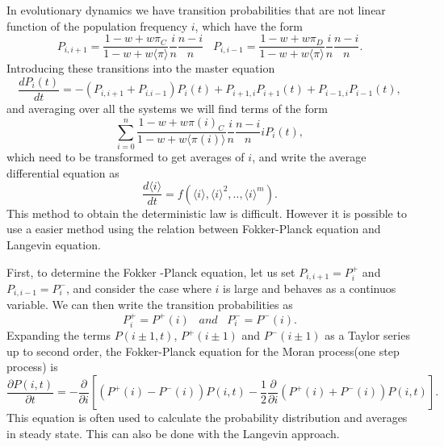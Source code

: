 In evolutionary dynamics we have transition probabilities that are not linear function of the population frequency $i$, which have the form
\begin{equation}
P_{i,i+1}=\frac{1-w+w\pi_C}{1-w+w\langle \pi \rangle}\frac{i}{n}\frac{n-i}{n}\;\;\; P_{i,i-1}=\frac{1-w+w\pi_D}{1-w+w\langle \pi \rangle}\frac{i}{n}\frac{n-i}{n}.
\end{equation}
Introducing these transitions into the  master equation  
\begin{equation}
\frac{d P_{i}(t)}{dt}=-(P_{i,i+1} + P_{i.i-1})P_{i}(t) + P_{i+1,i}P_{i+1}(t)+ P_{i-1,i}P_{i-1}(t),
\end{equation}
and averaging over all the systems we will find terms of the form
\begin{equation}
\sum\limits_{i=0}^{n}\frac{1-w+w\pi(i)_C}{1-w+w\langle \pi(i) \rangle}\frac{i}{n}\frac{n-i}{n} i P_{i}(t),
\end{equation}
which need to be transformed to get averages of $i$, and write the average differential equation as
\begin{equation}
\frac{d\langle i \rangle}{dt}=f(\langle i \rangle,\langle i \rangle^2, .., \langle i \rangle^m).
\end{equation}  
This method to obtain the deterministic law is difficult. However it is possible to use a easier method using the relation between Fokker-Planck equation and Langevin equation.

 
First, to determine the Fokker -Planck equation, let us set $P_{i,i+1}=P_{i}^{+}$ and $P_{i,i-1}=P_{i}^{-}$, and consider the case where $i$ is large and behaves as a continuos variable. We can then write the transition probabilities as
\begin{equation}
P_{i}^{+}=P^{+}(i)\;\;\; and \;\;\; P_{i}^{-}=P^{-}(i).
\end{equation}  
Expanding the terms $P(i\pm 1,t)$, $P^{+}(i\pm1)$ and $P^{-}(i\pm1)$ as a Taylor series up to second order, the Fokker-Planck equation for the Moran process(one step process) is\cite{Traulsen2005a}
\begin{equation}\label{6.19}
\frac{\partial P(i,t)}{\partial t}=-\frac{\partial}{\partial i}\left[\left(P^{+}(i)-P^{-}(i)\right)P(i,t)-\frac{1}{2}\frac{\partial}{\partial i}\left(P^{+}(i)+P^{-}(i)\right)P(i,t)\right].
\end{equation} 
This equation is often used to calculate the probability distribution and averages in steady state. This can also be done with the Langevin approach.

